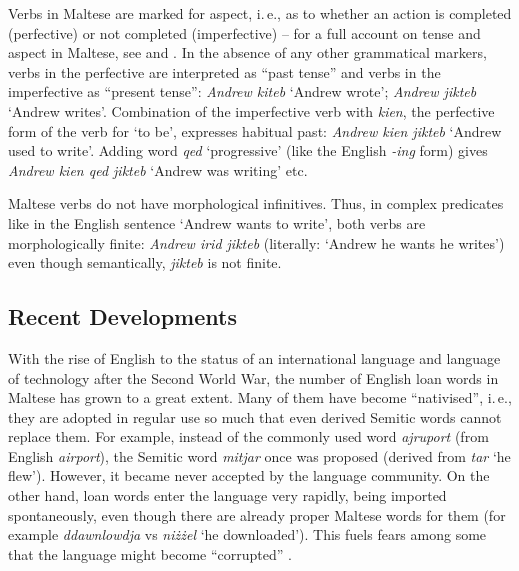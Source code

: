 \documentclass[]{../../metanetpaper}
\begin{document}
\begin{multicols}{2}

Verbs in Maltese are marked for aspect, i.\,e., as to whether an action is completed (perfective) or not completed (imperfective) -- for a full account on tense and aspect in Maltese, see \cite{Fabri:1995} and \cite{Ebert:2000}. In the absence of any other grammatical markers, verbs in the perfective are interpreted as ``past tense'' and verbs in the imperfective as ``present tense'': \emph{Andrew kiteb} `Andrew wrote'; \emph{Andrew jikteb} `Andrew writes'. Combination of the imperfective verb with \emph{kien}, the perfective form of the verb for `to be', expresses habitual past: \emph{Andrew kien jikteb} `Andrew used to write'. Adding word \emph{qed} `progressive' (like the English \emph{-ing} form) gives \emph{Andrew kien qed jikteb} `Andrew was writing' etc.

Maltese verbs do not have morphological infinitives. Thus, in complex predicates like in the English sentence `Andrew wants to write', both verbs are morphologically finite: \emph{Andrew irid jikteb} (literally: `Andrew he wants he writes') even though semantically, \emph{jikteb} is not finite.  

\subsection{Recent Developments}

With the rise of English to the status of an international language and language of technology after the Second World War, the number of English loan words in Maltese has grown to a great extent. Many of them have become ``nativised'', i.\,e., they are adopted in regular use so much that even derived Semitic words cannot replace them. For example, instead of the commonly used word \emph{ajruport} (from English \emph{airport}), the Semitic word \emph{mitjar} once was proposed (derived from \emph{tar} `he flew'). However, it became never accepted by the language community. On the other hand, loan words enter the language very rapidly, being imported spontaneously, even though there are already proper Maltese words for them (for example \emph{ddawnlowdja} vs \emph{niżżel} `he downloaded'). This fuels fears among some that the language might become ``corrupted'' \cite{Fabri:2011a}.


\end{multicols}
\end{document}
